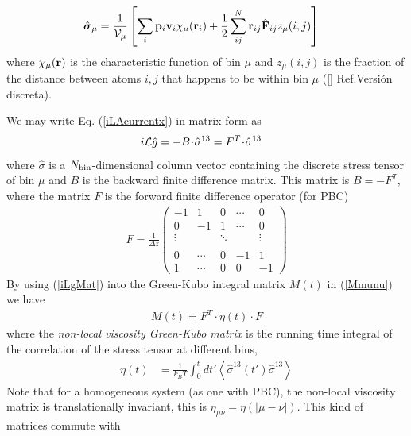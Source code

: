\documentclass[a4paper,openright,12pt]{book}
\newcommand{\esc}{\!\cdot\!}
\newcommand{\Pendiente}[1]{{\color{green}#1}} %
\newcommand{\llangle}{\left\langle}
\newcommand{\rrangle}{\right\rangle}
\begin{document}
\begin{align}
 \hat{ \boldsymbol{\sigma}}_{\mu}
&=
\frac{1}{{\cal V}_\mu} \left[\sum_i{\bf p}_i{\bf v}_i\chi_\mu({\bf r}_i)
+\frac{1}{2}\sum^{N}_{ij}{\bf r}_{ij}\hat{\bf F}_{ij}z_\mu(i,j)\right]
\label{sbin}
\end{align}
where $\chi_\mu({\bf r})$ is the  characteristic function of bin $\mu$
and $z_{\mu}(i,j)$ is the fraction of the distance between atoms $i,j$
that happens to be within bin $\mu$ (\Pendiente{\ref{} Ref.Versión discreta}).

We may write Eq. (\ref{iLAcurrentx}) in matrix form as
\begin{align}
  i{\cal L}\hat{g}&= -B\esc\hat{\sigma}^{13} =F^T\esc\hat{\sigma}^{13}
\label{iLgMat}
\end{align}
where  $\hat{\sigma}$ is  a  $N_{\rm  bin}$-dimensional column  vector
containing the  discrete stress tensor  of bin  $\mu$ and $B$  is the
backward finite difference matrix.  This matrix is $B=-F^T$, where the
matrix $ F$ is the forward finite difference operator (for PBC)
\begin{align}
 {F}=\frac{1}{\Delta z}\left(
    \begin{array}{rrrrr}
-1&1&0&\cdots&0\\
0&-1&1&\cdots&0\\
\vdots      &&\ddots&&\vdots\\
\\
0&\cdots&0&-1&1 
\\
1&\cdots&0&0&-1 \end{array}
\right)
\label{Dforward}
\end{align}
By using (\ref{iLgMat}) into the Green-Kubo integral matrix $M(t)$ in (\ref{Mmunu})
we have
\begin{align}
  M(t)=F^T\esc\eta(t)\esc F
\label{Mtfef}
\end{align}
where  the  \textit{non-local  viscosity  Green-Kubo  matrix}  is  the
running  time integral  of the  correlation  of the  stress tensor  at
different bins,
\begin{align}
  \eta(t) &=\frac{1}{k_BT}\int_0^{t}dt' 
  \llangle \hat{\sigma}^{13}(t')\hat{\sigma}^{13}\rrangle
\label{non-loc}
\end{align}
Note that  for a homogeneous system  (as one with PBC),  the non-local
viscosity    matrix   is    translationally    invariant,   this    is
$\eta_{\mu\nu}=\eta(|\mu-\nu|)$.  This kind  of matrices  commute with
\end{document}
